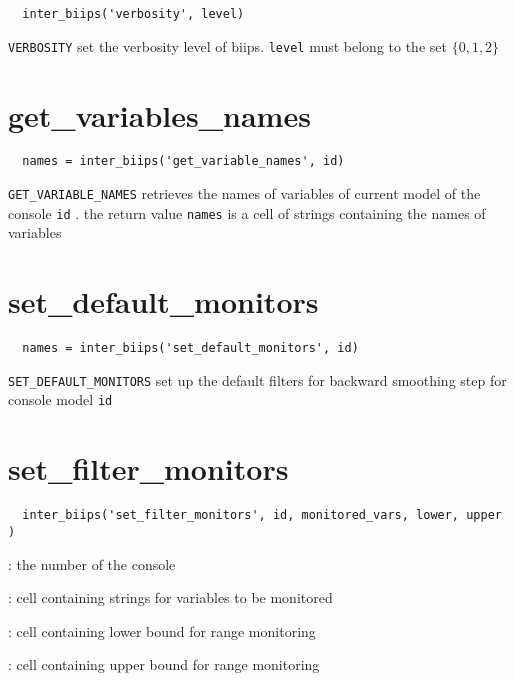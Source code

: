 \documentclass[11pt]{article}
\begin{document}
 \begin{lstlisting}
  inter_biips('verbosity', level) 
 \end{lstlisting}

  \texttt{VERBOSITY} set the verbosity level of biips. \texttt{level} must belong to the set $\{0,1,2\}$

\section{get\_variables\_names}

 \begin{lstlisting}
  names = inter_biips('get_variable_names', id)
 \end{lstlisting}

 \texttt{GET\_VARIABLE\_NAMES} retrieves the names of variables of current model of the console \texttt{id} . the return value \texttt{names}
 is a cell of strings containing the names of variables

\section{set\_default\_monitors}

 \begin{lstlisting}
  names = inter_biips('set_default_monitors', id)
 \end{lstlisting}

 \texttt{SET\_DEFAULT\_MONITORS} set up the default filters for backward smoothing step for console model \texttt{id}

\section{set\_filter\_monitors}
 \begin{lstlisting}
  inter_biips('set_filter_monitors', id, monitored_vars, lower, upper )
 \end{lstlisting}
   
   \begin{description}
   \setlength{\baselineskip}{0.1\baselineskip}
     \item[\texttt{id}]: the number of the console
     \item[\texttt{monitored\_vars}]: cell containing strings for variables to be monitored
     \item[\texttt{lower}]: cell containing lower bound for range monitoring
     \item[\texttt{upper}]: cell containing upper bound for range monitoring 
   
   \end{description}
\end{document}
